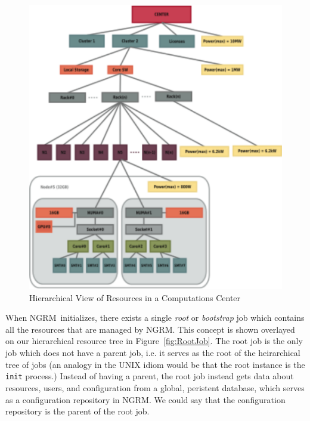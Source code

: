 \documentclass{article}
\newcommand{\ngrm}{NGRM}
\begin{document}
\begin{figure}
\centering
\includegraphics[scale=0.5]{../fig/resource_hierarchy.eps}
\caption{Hierarchical View of Resources in a Computations Center}
\label{fig:ResHierarchy}
\end{figure}

When \ngrm\ initializes, there exists a single {\em root} or {\em
bootstrap} job which contains all the resources that are managed by
\ngrm. This concept is shown overlayed on our hierarchical resource
tree in Figure~\ref{fig:RootJob}. The root job is the only job
which does not have a parent job, i.e. it serves as the root of
the heirarchical tree of jobs (an analogy in the UNIX idiom would
be that the root instance is the {\tt init} process.) Instead of
having a parent, the root job instead gets data about resources,
users, and configuration from a global, peristent database, which
serves as a configuration repository in \ngrm. We could say that
the configuration repository is the parent of the root job.
\end{document}
